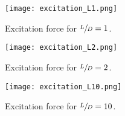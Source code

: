 \begin{Figure}
    \centering
    \captionsetup{type = figure}
    \texttt{[image: excitation\_L1.png]}
    \caption{Excitation force for $\sfrac{L}{D} = 1$.}
\end{Figure}
\begin{Figure}
    \centering
    \captionsetup{type = figure}
    \texttt{[image: excitation\_L2.png]}
    \caption{Excitation force for $\sfrac{L}{D} = 2$.}
\end{Figure}
\begin{Figure}
    \centering
    \captionsetup{type = figure}
    \texttt{[image: excitation\_L10.png]}
    \caption{Excitation force for $\sfrac{L}{D} = 10$.}
\end{Figure}

